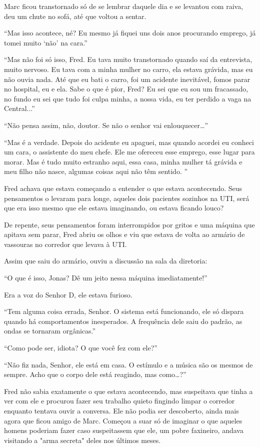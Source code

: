 Marc ficou transtornado só de se lembrar daquele dia e se levantou com
raiva, deu um chute no sofá, até que voltou a sentar.

``Mas isso acontece, né? Eu mesmo já fiquei uns dois anos procurando
emprego, já tomei muito `não' na cara.''

``Mas não foi só isso, Fred. Eu tava muito transtornado quando saí da
entrevista, muito nervoso. Eu tava com a minha mulher no carro, ela
estava grávida, mas eu não ouvia nada. Até que eu bati o carro, foi um
acidente inevitável, fomos parar no hospital, eu e ela. Sabe o que é
pior, Fred? Eu sei que eu sou um fracassado, no fundo eu sei que tudo
foi culpa minha, a nossa vida, eu ter perdido a vaga na Central...''

``Não pensa assim, não, doutor. Se não o senhor vai
enlouquecer\ldots{}''

``Mas é a verdade. Depois do acidente eu apaguei, mas quando acordei eu
conheci um cara, o assistente do meu chefe. Ele me ofereceu esse
emprego, esse lugar para morar. Mas é tudo muito estranho aqui, essa
casa, minha mulher tá grávida e meu filho não nasce, algumas coisas aqui
não têm sentido. ''

Fred achava que estava começando a entender o que estava acontecendo.
Seus pensamentos o levaram para longe, aqueles dois pacientes sozinhos
na UTI, será que era isso mesmo que ele estava imaginando, ou estava
ficando louco?

De repente, seus pensamentos foram interrompidos por gritos e uma
máquina que apitava sem parar, Fred abriu os olhos e viu que estava de
volta ao armário de vassouras no corredor que levava à UTI.

Assim que saiu do armário, ouviu a discussão na sala da diretoria:

``O que é isso, Jonas? Dê um jeito nessa máquina imediatamente!''

Era a voz do Senhor D, ele estava furioso.

``Tem alguma coisa errada, Senhor. O sistema está funcionando, ele só
dispara quando há comportamentos inesperados. A frequência dele saiu do
padrão, as ondas se tornaram orgânicas.''

``Como pode ser, idiota? O que você fez com ele?''

``Não fiz nada, Senhor, ele está em casa. O estímulo e a música são os
mesmos de sempre. Acho que o corpo dele está reagindo, mas
como\ldots{}?''

Fred não sabia exatamente o que estava acontecendo, mas suspeitava que
tinha a ver com ele e procurou fazer seu trabalho quieto fingindo limpar
o corredor enquanto tentava ouvir a conversa. Ele não podia ser
descoberto, ainda mais agora que ficou amigo de Marc. Começou a suar só
de imaginar o que aqueles homens poderiam fazer caso suspeitassem que
ele, um pobre faxineiro, andava visitando a "arma secreta" deles nos
últimos meses.

